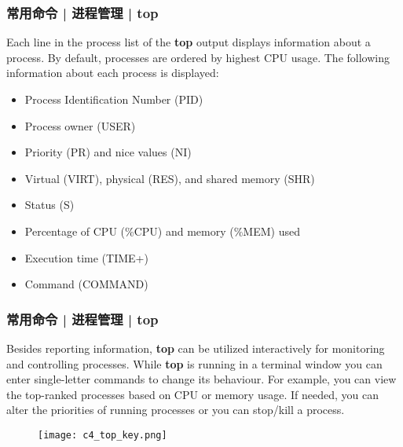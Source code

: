 \begin{frame}
  \frametitle{常用命令 | 进程管理 | top}
  Each line in the process list of the \textbf{top} output displays information about a process. By default, processes are ordered by highest CPU usage. The following information about each process is displayed: 
  \begin{itemize}
    \item Process Identification Number (PID)
    \item Process owner (USER)
    \item Priority (PR) and nice values (NI)
    \item Virtual (VIRT), physical (RES), and shared memory (SHR)
    \item Status (S)
    \item Percentage of CPU (\%CPU) and memory (\%MEM) used
    \item Execution time (TIME+)
    \item Command (COMMAND)
  \end{itemize}
\end{frame}

\begin{frame}
  \frametitle{常用命令 | 进程管理 | top}
  {\footnotesize
  Besides reporting information, \textbf{top} can be utilized interactively for monitoring and controlling processes. While \textbf{top} is running in a terminal window you can enter single-letter commands to change its behaviour. For example, you can view the top-ranked processes based on CPU or memory usage. If needed, you can alter the priorities of running processes or you can stop/kill a process.
  }
  \vspace{-0.2cm}
  \begin{figure}
    \centering
    \texttt{[image: c4\_top\_key.png]}
  \end{figure}
\end{frame}

